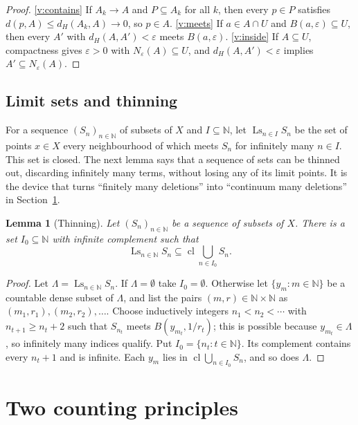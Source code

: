 \documentclass[11pt,reqno]{amsart}
\theoremstyle{plain}
\newtheorem{lemma}[theorem]{Lemma}
\theoremstyle{definition}
\theoremstyle{remark}
\newcommand{\cl}{\operatorname{cl}}
\newcommand{\Ls}{\operatorname{Ls}}
\newcommand{\N}{\mathbb{N}}
\begin{document}
\begin{proof}
\ref{v:contains} If $A_k\to A$ and $P\subseteq A_k$ for all $k$, then every $p\in P$ satisfies $d(p,A)\le d_H(A_k,A)\to0$, so $p\in A$. \ref{v:meets} If $a\in A\cap U$ and $B(a,\varepsilon)\subseteq U$, then every $A'$ with $d_H(A,A')<\varepsilon$ meets $B(a,\varepsilon)$. \ref{v:inside} If $A\subseteq U$, compactness gives $\varepsilon>0$ with $N_\varepsilon(A)\subseteq U$, and $d_H(A,A')<\varepsilon$ implies $A'\subseteq N_\varepsilon(A)$.
\end{proof}

\subsection{Limit sets and thinning}
For a sequence $(S_n)_{n\in\N}$ of subsets of $X$ and $I\subseteq\N$, let $\Ls_{n\in I}S_n$ be the set of points $x\in X$ every neighbourhood of which meets $S_n$ for infinitely many $n\in I$. This set is closed. The next lemma says that a sequence of sets can be thinned out, discarding infinitely many terms, without losing any of its limit points. It is the device that turns ``finitely many deletions'' into ``continuum many deletions'' in Section~\ref{S:obstructions}.

\begin{lemma}[Thinning]\label{L:thinning}
Let $(S_n)_{n\in\N}$ be a sequence of subsets of $X$. There is a set $I_0\subseteq\N$ with infinite complement such that
\[
\Ls_{n\in\N}S_n\subseteq\cl\bigcup_{n\in I_0}S_n.
\]
\end{lemma}

\begin{proof}
Let $\Lambda=\Ls_{n\in\N}S_n$. If $\Lambda=\emptyset$ take $I_0=\emptyset$. Otherwise let $\{y_m:m\in\N\}$ be a countable dense subset of $\Lambda$, and list the pairs $(m,r)\in\N\times\N$ as $(m_1,r_1),(m_2,r_2),\dots$. Choose inductively integers $n_1<n_2<\cdots$ with $n_{t+1}\ge n_t+2$ such that $S_{n_t}$ meets $B(y_{m_t},1/r_t)$; this is possible because $y_{m_t}\in\Lambda$, so infinitely many indices qualify. Put $I_0=\{n_t:t\in\N\}$. Its complement contains every $n_t+1$ and is infinite. Each $y_m$ lies in $\cl\bigcup_{n\in I_0}S_n$, and so does $\Lambda$.
\end{proof}

\section{Two counting principles}\label{S:obstructions}
\end{document}
